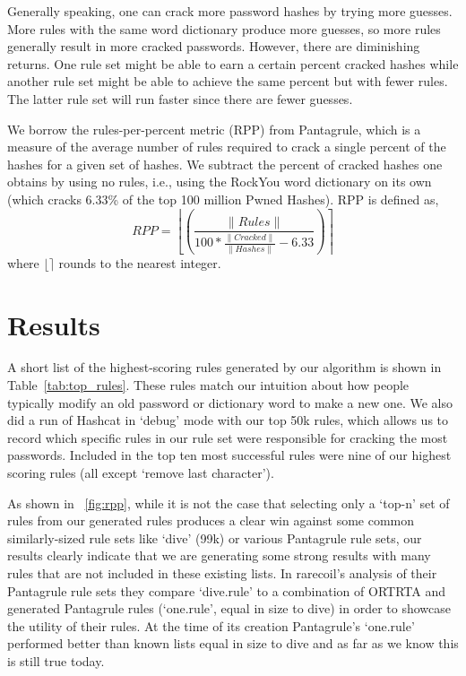 \documentclass[letterpaper,twocolumn,10pt]{article}
\begin{document}
Generally speaking, one can crack more password hashes by trying more guesses.
More rules with the same word dictionary produce more guesses, so more rules
generally result in more cracked passwords. However, there are diminishing
returns. One rule set might be able to earn a certain percent cracked hashes
while another rule set might be able to achieve the same percent but with fewer
rules. The latter rule set will run faster since there are fewer guesses.

We borrow the rules-per-percent metric (RPP) from Pantagrule\cite{pantagrule},
which is a measure of the average number of rules required to crack a single
percent of the hashes for a given set of hashes. We subtract the percent of
cracked hashes one obtains by using no rules, i.e., using the RockYou
word dictionary on its own (which cracks 6.33\% of the top 100 million Pwned
Hashes). RPP is defined as,
\begin{equation*}
RPP =\left\lfloor\left(\frac{\|Rules\|}{100*\frac{\|Cracked\|}{\|Hashes\|} -
6.33}\right)\right\rceil
\end{equation*}
where $\lfloor\rceil$ rounds to the nearest integer.

\section{Results}
\label{sec:results}

A short list of the highest-scoring rules generated by our algorithm is shown
in Table~\ref{tab:top_rules}. These rules match our intuition about how people
typically modify an old password or dictionary word to make a new one. We also
did a run of Hashcat in `debug' mode with our top 50k rules, which allows us to
record which specific rules in our rule set were responsible for cracking the most
passwords. Included in the top ten most successful rules were nine of our
highest scoring rules (all except `remove last character').

As shown in ~\ref{fig:rpp}, while it is not the case that selecting only a
`top-n' set of rules from our
generated rules produces a clear win against some common similarly-sized
rule sets like `dive' (99k) or various Pantagrule rule sets, our results
clearly indicate that we are generating some strong results with many rules
that are not included in these existing lists. In rarecoil's analysis of their Pantagrule rule sets
they compare `dive.rule' to a combination of ORTRTA and generated Pantagrule
rules (`one.rule', equal in size to dive) in order to showcase the utility of their
rules. At the time of its creation Pantagrule's `one.rule' performed better than
known lists equal in size to dive and as far as we know this is still true today.
\end{document}
